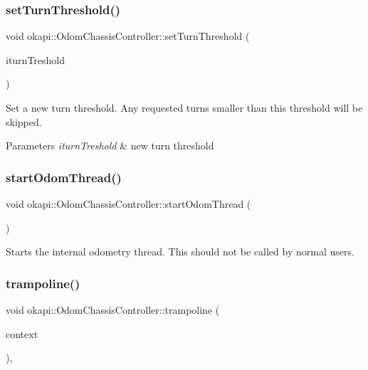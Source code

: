 \subsubsection{\texorpdfstring{setTurnThreshold()}{setTurnThreshold()}}
{\footnotesize\ttfamily void okapi\+::\+Odom\+Chassis\+Controller\+::set\+Turn\+Threshold (\begin{DoxyParamCaption}\item[{const Q\+Angle \&}]{iturn\+Treshold }\end{DoxyParamCaption})\hspace{0.3cm}{\ttfamily [virtual]}}

Set a new turn threshold. Any requested turns smaller than this threshold will be skipped.


\begin{DoxyParams}{Parameters}
{\em iturn\+Treshold} & new turn threshold \\
\hline
\end{DoxyParams}
\mbox{\label{classokapi_1_1OdomChassisController_a519c7ad1905fbf9132c95e1e14bc973c}} 
\subsubsection{\texorpdfstring{startOdomThread()}{startOdomThread()}}
{\footnotesize\ttfamily void okapi\+::\+Odom\+Chassis\+Controller\+::start\+Odom\+Thread (\begin{DoxyParamCaption}{ }\end{DoxyParamCaption})}

Starts the internal odometry thread. This should not be called by normal users. \mbox{\label{classokapi_1_1OdomChassisController_a11be9684a858686cfc3204b493422308}} 
\subsubsection{\texorpdfstring{trampoline()}{trampoline()}}
{\footnotesize\ttfamily void okapi\+::\+Odom\+Chassis\+Controller\+::trampoline (\begin{DoxyParamCaption}\item[{void $\ast$}]{context }\end{DoxyParamCaption})\hspace{0.3cm}{\ttfamily [static]}, {\ttfamily [protected]}}

